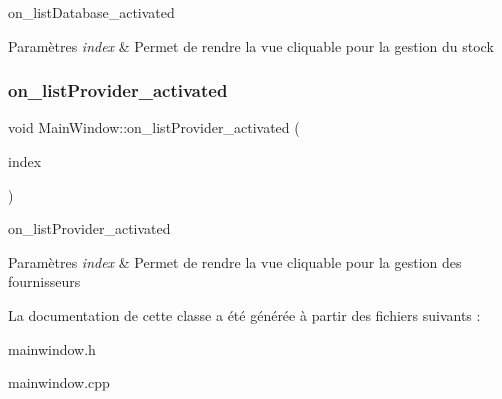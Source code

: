 on\+\_\+list\+Database\+\_\+activated 


\begin{DoxyParams}{Paramètres}
{\em index} & Permet de rendre la vue cliquable pour la gestion du stock \\
\hline
\end{DoxyParams}
\mbox{\label{class_main_window_a5c37de425b15bf9117aae7b6b67df243}} 
\subsubsection{\texorpdfstring{on\+\_\+list\+Provider\+\_\+activated}{on\_listProvider\_activated}}
{\footnotesize\ttfamily void Main\+Window\+::on\+\_\+list\+Provider\+\_\+activated (\begin{DoxyParamCaption}\item[{const Q\+Model\+Index \&}]{index }\end{DoxyParamCaption})\hspace{0.3cm}{\ttfamily [slot]}}



on\+\_\+list\+Provider\+\_\+activated 


\begin{DoxyParams}{Paramètres}
{\em index} & Permet de rendre la vue cliquable pour la gestion des fournisseurs \\
\hline
\end{DoxyParams}


La documentation de cette classe a été générée à partir des fichiers suivants \+:\begin{DoxyCompactItemize}
\item 
mainwindow.\+h\item 
mainwindow.\+cpp\end{DoxyCompactItemize}
